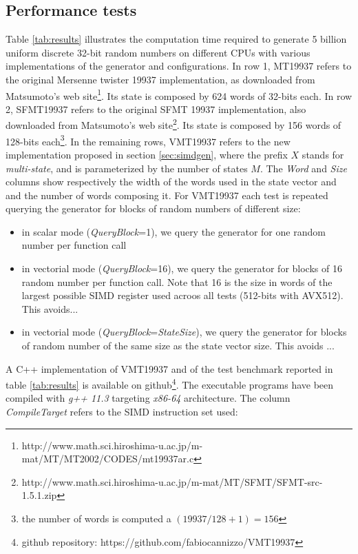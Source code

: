 \documentclass[preprint,1p,times]{elsarticle}
\begin{document}
\subsection{Performance tests}
\label{sec:tests}
\noindent Table \ref{tab:results} illustrates the computation time required to generate 5 billion uniform discrete 32-bit random numbers on different CPUs with various implementations of the generator and configurations.
In row 1, MT19937 refers to the original Mersenne twister 19937 implementation, as downloaded from Matsumoto's web site\footnote{\label{fn:orig}http://www.math.sci.hiroshima-u.ac.jp/m-mat/MT/MT2002/CODES/mt19937ar.c}. Its state is composed by 624 words of 32-bits each.
In row 2, SFMT19937 refers to the original SFMT 19937 implementation, also downloaded from Matsumoto's web site\footnote{http://www.math.sci.hiroshima-u.ac.jp/m-mat/MT/SFMT/SFMT-src-1.5.1.zip}. Its state is composed by 156 words of 128-bits each\footnote{the number of words is computed a $(19937 / 128 + 1)=156$}.
In the remaining rows, VMT19937 refers to the new implementation proposed in section \ref{sec:simdgen}, where the prefix $X$ stands for \textit{multi-state}, and is parameterized by the number of states $M$.
The \textit{Word} and \textit{Size} columns show respectively the width of the words used in the state vector and and the number of words composing it.
For VMT19937 each test is repeated querying the generator for blocks of random numbers of different size:
\begin{itemize}
    \item in scalar mode (\textit{QueryBlock}=1), we query the generator for one random number per function call
    \item in vectorial mode (\textit{QueryBlock}=16), we query the generator for blocks of 16 random number per function call. Note that 16 is the size in words of the largest possible SIMD register used acroos all tests (512-bits with AVX512). This avoids...
    \item in vectorial mode (\textit{QueryBlock}=\textit{StateSize}), we query the generator for blocks of random number of the same size as the state vector size. This avoids ...
\end{itemize}
A C++ implementation of VMT19937 and of the test benchmark reported in table \ref{tab:results} is available on github\footnote{github repository: https://github.com/fabiocannizzo/VMT19937}. The executable programs have been compiled with \textit{g++ 11.3} targeting \textit{x86-64} architecture. The column \textit{CompileTarget} refers to the SIMD instruction set used:
\end{document}
